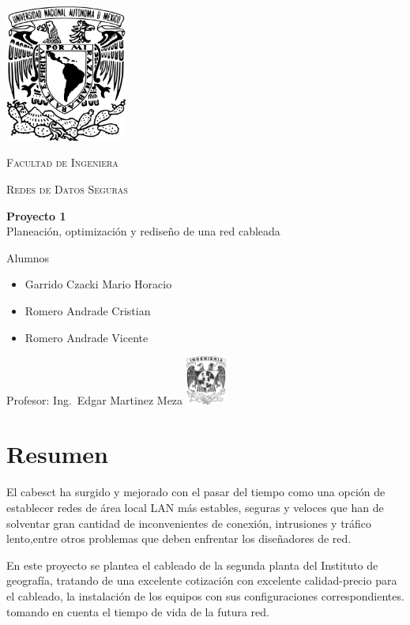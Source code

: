 \documentclass[letterpaper]{article}
\begin{document}
\begin{titlepage}
  \centering
  \includegraphics[width=0.3\textwidth]{unam_logo}\vfill{}
  {\scshape\Huge Facultad de Ingeniera\par}\vspace{0.5cm}
  {\scshape\Large Redes de Datos Seguras\par}\vfill
  {\huge \textbf{Proyecto 1}\\Planeación, optimización y
    rediseño de una red cableada}\vfill
  
  {\Large
    Alumnos\begin{itemize}
    \item Garrido Czacki Mario Horacio
    \item Romero Andrade Cristian
    \item Romero Andrade Vicente

    \end{itemize}
  }\vfill
  {\large Profesor: Ing.~Edgar Martinez Meza}\vfill
  \includegraphics[width=0.1\textwidth]{inge_logo}
  
  
\end{titlepage}

\tableofcontents{}\newpage

\section{Resumen}\label{sec:resumen}

El \gls{cabesct}  ha  surgido  y  mejorado  con
el  pasar  del  tiempo  como  una opción de establecer
redes de área local LAN más estables, seguras y veloces
que han de solventar gran cantidad  de inconvenientes de
conexión,  intrusiones y tráfico lento,entre otros problemas
que deben enfrentar los diseñadores de red.

En este proyecto se plantea el cableado de la segunda planta
del Instituto de geografía, tratando de una excelente cotización
con excelente calidad-precio para el cableado, la instalación de
los equipos con sus configuraciones correspondientes.
tomando en cuenta el tiempo de vida
de la futura red. 
\end{document}
